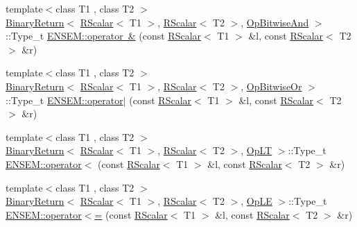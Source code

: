 \begin{DoxyCompactItemize}
\item 
{\footnotesize template$<$class T1 , class T2 $>$ }\\\mbox{\hyperlink{structENSEM_1_1BinaryReturn}{Binary\+Return}}$<$ \mbox{\hyperlink{classENSEM_1_1RScalar}{R\+Scalar}}$<$ T1 $>$, \mbox{\hyperlink{classENSEM_1_1RScalar}{R\+Scalar}}$<$ T2 $>$, \mbox{\hyperlink{structENSEM_1_1OpBitwiseAnd}{Op\+Bitwise\+And}} $>$\+::Type\+\_\+t \mbox{\hyperlink{group__rscalar_ga389f96c37c3b933acfc68be93291ae0e}{E\+N\+S\+E\+M\+::operator \&}} (const \mbox{\hyperlink{classENSEM_1_1RScalar}{R\+Scalar}}$<$ T1 $>$ \&l, const \mbox{\hyperlink{classENSEM_1_1RScalar}{R\+Scalar}}$<$ T2 $>$ \&r)
\item 
{\footnotesize template$<$class T1 , class T2 $>$ }\\\mbox{\hyperlink{structENSEM_1_1BinaryReturn}{Binary\+Return}}$<$ \mbox{\hyperlink{classENSEM_1_1RScalar}{R\+Scalar}}$<$ T1 $>$, \mbox{\hyperlink{classENSEM_1_1RScalar}{R\+Scalar}}$<$ T2 $>$, \mbox{\hyperlink{structENSEM_1_1OpBitwiseOr}{Op\+Bitwise\+Or}} $>$\+::Type\+\_\+t \mbox{\hyperlink{group__rscalar_ga9e5397786fb0d112594a1fb887b1a58d}{E\+N\+S\+E\+M\+::operator$\vert$}} (const \mbox{\hyperlink{classENSEM_1_1RScalar}{R\+Scalar}}$<$ T1 $>$ \&l, const \mbox{\hyperlink{classENSEM_1_1RScalar}{R\+Scalar}}$<$ T2 $>$ \&r)
\item 
{\footnotesize template$<$class T1 , class T2 $>$ }\\\mbox{\hyperlink{structENSEM_1_1BinaryReturn}{Binary\+Return}}$<$ \mbox{\hyperlink{classENSEM_1_1RScalar}{R\+Scalar}}$<$ T1 $>$, \mbox{\hyperlink{classENSEM_1_1RScalar}{R\+Scalar}}$<$ T2 $>$, \mbox{\hyperlink{structENSEM_1_1OpLT}{Op\+LT}} $>$\+::Type\+\_\+t \mbox{\hyperlink{group__rscalar_gaa8cbddeaf30b9bc34c8cca497a259805}{E\+N\+S\+E\+M\+::operator$<$}} (const \mbox{\hyperlink{classENSEM_1_1RScalar}{R\+Scalar}}$<$ T1 $>$ \&l, const \mbox{\hyperlink{classENSEM_1_1RScalar}{R\+Scalar}}$<$ T2 $>$ \&r)
\item 
{\footnotesize template$<$class T1 , class T2 $>$ }\\\mbox{\hyperlink{structENSEM_1_1BinaryReturn}{Binary\+Return}}$<$ \mbox{\hyperlink{classENSEM_1_1RScalar}{R\+Scalar}}$<$ T1 $>$, \mbox{\hyperlink{classENSEM_1_1RScalar}{R\+Scalar}}$<$ T2 $>$, \mbox{\hyperlink{structENSEM_1_1OpLE}{Op\+LE}} $>$\+::Type\+\_\+t \mbox{\hyperlink{group__rscalar_ga17ac158bc4a28aed7618e341087e8084}{E\+N\+S\+E\+M\+::operator$<$=}} (const \mbox{\hyperlink{classENSEM_1_1RScalar}{R\+Scalar}}$<$ T1 $>$ \&l, const \mbox{\hyperlink{classENSEM_1_1RScalar}{R\+Scalar}}$<$ T2 $>$ \&r)

\end{DoxyCompactItemize}
